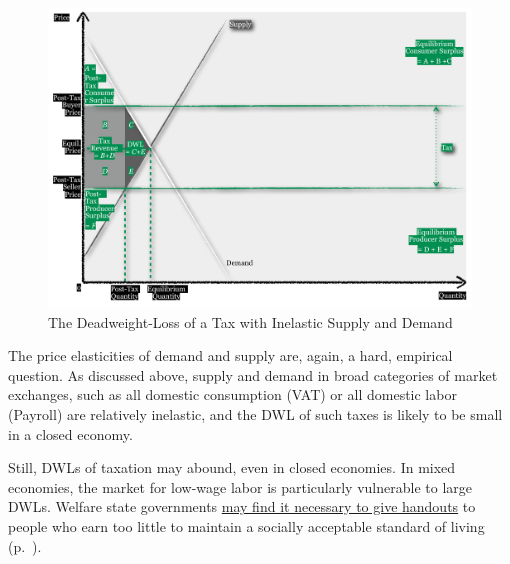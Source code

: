 \begin{figure}[htbp]
	\centering
	\includegraphics[width=1\textwidth]{./img/smaller-DWL}  
	\caption[Deadweight-Loss of a Tax with Inelastic Suppy and Demand]{The Deadweight-Loss of a Tax with Inelastic Supply and Demand}
	\label{fig:smaller-DWL}
\end{figure}

The price elasticities of demand and supply are, again, a hard, empirical question. As discussed above, supply and demand in broad categories of market exchanges, such as all domestic consumption (\gls{VAT}) or all domestic labor (\gls{Payroll}) are relatively inelastic, and the \gls{DWL} of such taxes is likely to be small in a closed economy.

Still, \glspl{DWL} of taxation may abound, even in closed economies. In mixed economies, the market for low-wage labor is particularly vulnerable to large \gls{DWL}s. Welfare state governments  \hyperref[sec:distribution]{may find it necessary to give handouts} to people who earn too little to maintain a socially acceptable standard of living (p.~\pageref{sec:distribution}). 

